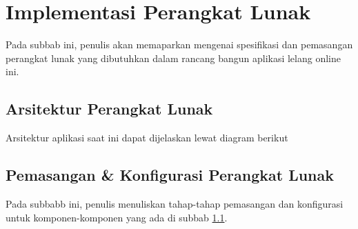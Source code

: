   \section{Implementasi Perangkat Lunak}
  Pada subbab ini, penulis akan memaparkan mengenai spesifikasi dan pemasangan perangkat lunak yang dibutuhkan dalam rancang bangun aplikasi lelang online ini.
  
  \subsection{Arsitektur Perangkat Lunak}
  \label{arsitektur-pl-final-subbab}
	  Arsitektur aplikasi saat ini dapat dijelaskan lewat diagram berikut
	  
	  
	  
	  
  
  \subsection{Pemasangan \& Konfigurasi Perangkat Lunak}
	  Pada subbabb ini, penulis menuliskan tahap-tahap pemasangan dan konfigurasi untuk komponen-komponen yang ada di subbab \ref{arsitektur-pl-final-subbab}.
	  
	
	
	
	
	
	
	
	
	
	
	
	 
  
  
  
  
  
  
